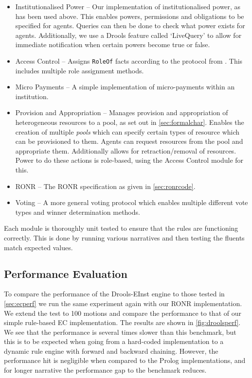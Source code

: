 \begin{itemize}
\item Institutionalised Power -- Our implementation of institutionalised power, as has been used above. This enables powers, permissions and obligations to be specified for agents. Queries can then be done to check what power exists for agents. Additionally, we use a Drools feature called `LiveQuery' to allow for immediate notification when certain powers become true or false.
\item Access Control -- Assigns \texttt{RoleOf} facts according to the protocol from \citet{Pitt2012b}. This includes multiple role assignment methods.
\item Micro Payments -- A simple implementation of micro-payments within an institution.
\item Provision and Appropriation -- Manages provision and appropriation of heterogeneous resources to a pool, as set out in \autoref{sec:formalchar}. Enables the creation of multiple \emph{pools} which can specify certain types of resource which can be provisioned to them. Agents can request resources from the pool and appropriate them. Additionally allows for retraction/removal of resources. Power to do these actions is role-based, using the Access Control module for this.
\item \ac{RONR} -- The \ac{RONR} specification as given in \autoref{sec:ronrcode}.
\item Voting -- A more general voting protocol which enables multiple different vote types and winner determination methods.
\end{itemize}

Each module is thoroughly unit tested to ensure that the rules are functioning
correctly. This is done by running various narratives and then testing the
fluents match expected values.

\subsection{Performance Evaluation}

To compare the performance of the Drools-EInst engine to those tested in
\autoref{sec:ecperf} we run the same experiment again with our \ac{RONR}
implementation. We extend the test to 100 motions and compare the performance
to that of our simple rule-based \ac{EC} implementation. The results are shown
in \autoref{fig:droolsperf}. We see that the performance is several times
slower than this benchmark, but this is to be expected when going from a hard-coded
implementation to a dynamic rule engine with forward and backward
chaining. However, the performance hit is negligible when compared to the
Prolog implementations, and for longer narrative the performance gap to the
benchmark reduces.


